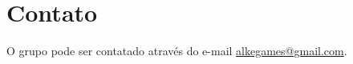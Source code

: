 \AddToShipoutPicture{\BackgroundPic}

\section*{Contato}
O grupo pode ser contatado através do e-mail \url{alkegames@gmail.com}.

